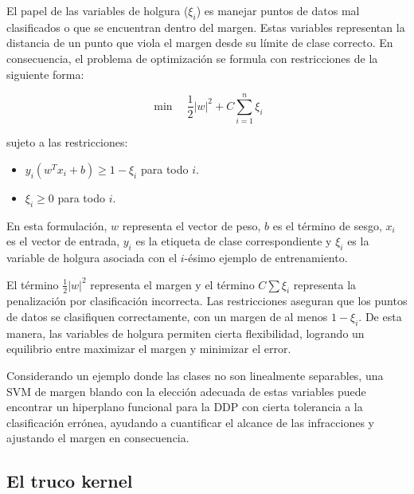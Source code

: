 El papel de las variables de holgura ($\xi_i$) es manejar puntos de datos mal clasificados o que se encuentran dentro del margen. Estas variables representan la distancia de un punto que viola el margen desde su límite de clase correcto. En consecuencia, el problema de optimización se formula con restricciones de la siguiente forma:

\begin{equation}
\min \quad \frac{1}{2} |w|^2 + C \sum_{i=1}^{n} \xi_i
\end{equation}

\noindent sujeto a las restricciones:

\begin{itemize}
\item $y_i(w^T x_i + b) \geq 1 - \xi_i$ para todo $i$.
\item $\xi_i \geq 0$ para todo $i$.
\end{itemize}

En esta formulación, $w$ representa el vector de peso, $b$ es el término de sesgo, $x_i$ es el vector de entrada, $y_i$ es la etiqueta de clase correspondiente y $\xi_i$ es la variable de holgura asociada con el $i$-ésimo ejemplo de entrenamiento.

El término $\frac{1}{2} |w|^2$ representa el margen y el término $C \sum \xi_i$ representa la penalización por clasificación incorrecta. Las restricciones aseguran que los puntos de datos se clasifiquen correctamente, con un margen de al menos $1 - \xi_i$. De esta manera, las variables de holgura permiten cierta flexibilidad, logrando un equilibrio entre maximizar el margen y minimizar el error.

Considerando un ejemplo donde las clases no son linealmente separables, una SVM de margen blando con la elección adecuada de estas variables puede encontrar un hiperplano funcional para la DDP con cierta tolerancia a la clasificación errónea, ayudando a cuantificar el alcance de las infracciones y ajustando el margen en consecuencia.

\subsection{El truco kernel}

